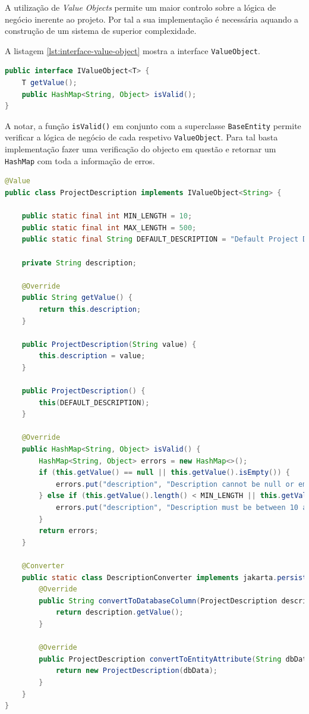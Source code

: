 A utilização de \textit{Value Objects} permite um maior controlo sobre a lógica de negócio inerente ao projeto. Por tal a sua implementação é necessária aquando a construção de um sistema de superior complexidade. 

A listagem \ref{lst:interface-value-object} mostra a interface \lstinline|ValueObject|.

\begin{lstlisting}[language=Java,caption={Interface \textit{Value Object}},label={lst:interface-value-object}]
public interface IValueObject<T> {
    T getValue();
    public HashMap<String, Object> isValid();
}
\end{lstlisting}

A notar, a função \lstinline|isValid()| em conjunto com a superclasse \lstinline|BaseEntity| permite verificar a lógica de negócio de cada respetivo \lstinline|ValueObject|. Para tal basta implementação fazer uma verificação do objecto em questão e retornar um \lstinline|HashMap| com toda a informação de erros.

\begin{lstlisting}[language=Java,caption={Classe \textit{ProjectDescription}},label={lst:class-project-description}]
@Value
public class ProjectDescription implements IValueObject<String> {

    public static final int MIN_LENGTH = 10;
    public static final int MAX_LENGTH = 500;
    public static final String DEFAULT_DESCRIPTION = "Default Project Description";

    private String description;

    @Override
    public String getValue() {
        return this.description;
    }

    public ProjectDescription(String value) {
        this.description = value;
    }

    public ProjectDescription() {
        this(DEFAULT_DESCRIPTION);
    }

    @Override
    public HashMap<String, Object> isValid() {
        HashMap<String, Object> errors = new HashMap<>();
        if (this.getValue() == null || this.getValue().isEmpty()) {
            errors.put("description", "Description cannot be null or empty");
        } else if (this.getValue().length() < MIN_LENGTH || this.getValue().length() > MAX_LENGTH) {
            errors.put("description", "Description must be between 10 and 500 characters long");
        }
        return errors;
    }

    @Converter
    public static class DescriptionConverter implements jakarta.persistence.AttributeConverter<ProjectDescription, String> {
        @Override
        public String convertToDatabaseColumn(ProjectDescription description) {
            return description.getValue();
        }

        @Override
        public ProjectDescription convertToEntityAttribute(String dbData) {
            return new ProjectDescription(dbData);
        }
    }
}
\end{lstlisting}

